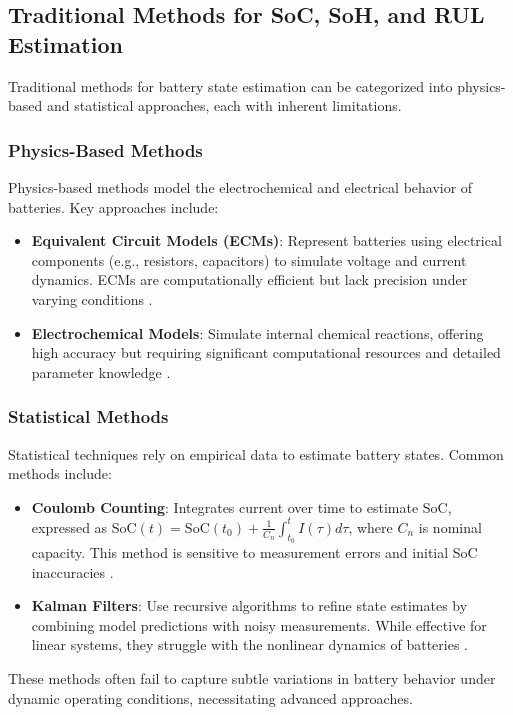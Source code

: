 \subsection{Traditional Methods for SoC, SoH, and RUL Estimation}
Traditional methods for battery state estimation can be categorized into physics-based and statistical approaches, each with inherent limitations.

\subsubsection{Physics-Based Methods}
Physics-based methods model the electrochemical and electrical behavior of batteries. Key approaches include:
\begin{itemize}
    \item \textbf{Equivalent Circuit Models (ECMs)}: Represent batteries using electrical components (e.g., resistors, capacitors) to simulate voltage and current dynamics. ECMs are computationally efficient but lack precision under varying conditions \cite{Ref5}.
    \item \textbf{Electrochemical Models}: Simulate internal chemical reactions, offering high accuracy but requiring significant computational resources and detailed parameter knowledge \cite{Ref5}.
\end{itemize}

\subsubsection{Statistical Methods}
Statistical techniques rely on empirical data to estimate battery states. Common methods include:
\begin{itemize}
    \item \textbf{Coulomb Counting}: Integrates current over time to estimate SoC, expressed as \( \text{SoC}(t) = \text{SoC}(t_0) + \frac{1}{C_n} \int_{t_0}^t I(\tau) d\tau \), where \( C_n \) is nominal capacity. This method is sensitive to measurement errors and initial SoC inaccuracies \cite{Report}.
    \item \textbf{Kalman Filters}: Use recursive algorithms to refine state estimates by combining model predictions with noisy measurements. While effective for linear systems, they struggle with the nonlinear dynamics of batteries \cite{Report}.
\end{itemize}

These methods often fail to capture subtle variations in battery behavior under dynamic operating conditions, necessitating advanced approaches.

